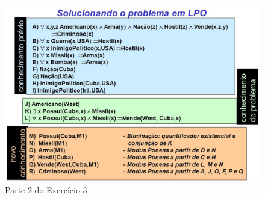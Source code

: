 \documentclass[a4paper,12pt]{article}
\begin{document}
\begin{figure}[h!]
\centering
 \includegraphics[scale=0.5]{figuras/exercicio_logica_01.jpg}
 \caption{Parte 2 do Exercício 3}
 \label{fig_01}
\end{figure}
\end{document}
